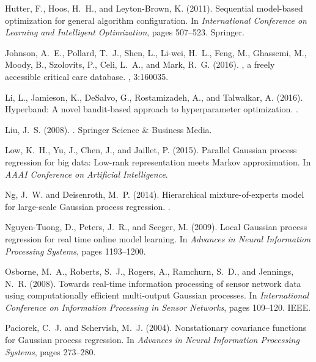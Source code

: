 \documentclass[12pt,letterpaper]{article}
\begin{document}
\begin{thebibliography}{}
Hutter, F., Hoos, H.~H., and Leyton-Brown, K. (2011).
\newblock Sequential model-based optimization for general algorithm
  configuration.
\newblock In {\em International Conference on Learning and Intelligent
  Optimization}, pages 507--523. Springer.

Johnson, A.~E., Pollard, T.~J., Shen, L., Li-wei, H.~L., Feng, M., Ghassemi,
  M., Moody, B., Szolovits, P., Celi, L.~A., and Mark, R.~G. (2016).
, a freely accessible critical care database.
, 3:160035.

Li, L., Jamieson, K., DeSalvo, G., Rostamizadeh, A., and Talwalkar, A. (2016).
\newblock Hyperband: A novel bandit-based approach to hyperparameter
  optimization.
.

Liu, J.~S. (2008).
.
\newblock Springer Science \& Business Media.

Low, K.~H., Yu, J., Chen, J., and Jaillet, P. (2015).
\newblock Parallel {G}aussian process regression for big data: Low-rank
  representation meets {M}arkov approximation.
\newblock In {\em AAAI Conference on Artificial Intelligence}.

Ng, J.~W. and Deisenroth, M.~P. (2014).
\newblock Hierarchical mixture-of-experts model for large-scale {G}aussian
  process regression.
.

Nguyen-Tuong, D., Peters, J.~R., and Seeger, M. (2009).
\newblock Local {G}aussian process regression for real time online model
  learning.
\newblock In {\em Advances in Neural Information Processing Systems}, pages
  1193--1200.

Osborne, M.~A., Roberts, S.~J., Rogers, A., Ramchurn, S.~D., and Jennings,
  N.~R. (2008).
\newblock Towards real-time information processing of sensor network data using
  computationally efficient multi-output {G}aussian processes.
\newblock In {\em International Conference on Information Processing in Sensor
  Networks}, pages 109--120. IEEE.

Paciorek, C.~J. and Schervish, M.~J. (2004).
\newblock Nonstationary covariance functions for {G}aussian process regression.
\newblock In {\em Advances in Neural Information Processing Systems}, pages
  273--280.


\end{thebibliography}
\end{document}
